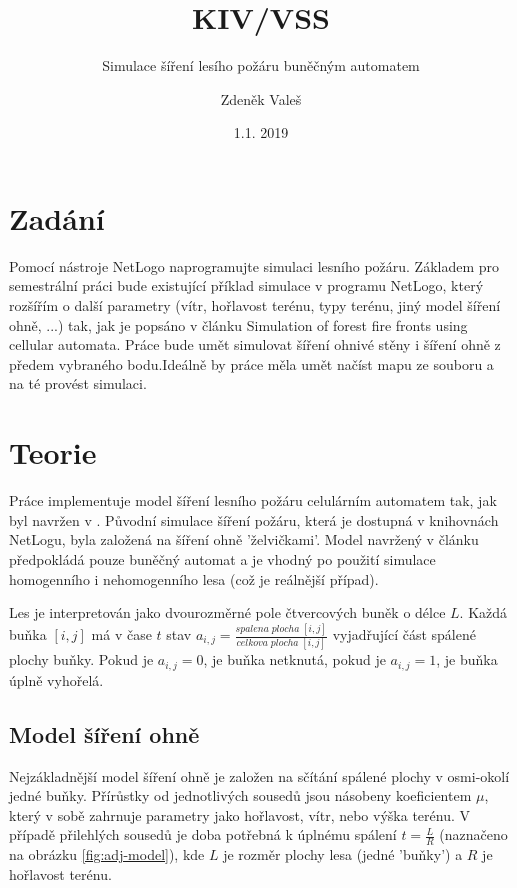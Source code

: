 \documentclass[11pt,a4paper]{scrartcl}
\begin{document}
	\title{KIV/VSS}
	\subtitle{Simulace šíření lesího požáru buněčným automatem}
	\author{Zdeněk Valeš}
	\date{1.1. 2019}
	\maketitle
	\newpage
	
	\section{Zadání}
	Pomocí nástroje NetLogo naprogramujte simulaci lesního požáru. Základem pro semestrální práci bude existující příklad simulace v programu NetLogo, který rozšířím o další parametry (vítr, hořlavost terénu, typy terénu, jiný model šíření ohně, ...) tak, jak je popsáno v článku Simulation of forest fire fronts using cellular automata\cite{source_article}. Práce bude umět simulovat šíření ohnivé stěny i šíření ohně z předem vybraného bodu.Ideálně by práce měla umět načíst mapu ze souboru a na té provést simulaci.
	
	\section{Teorie}
	Práce implementuje model šíření lesního požáru celulárním automatem tak, jak byl navržen v \cite{source_article}. Původní simulace šíření požáru, která je dostupná v knihovnách NetLogu, byla založená na šíření ohně 'želvičkami'. Model navržený v článku předpokládá pouze buněčný automat a je vhodný po použití simulace homogenního i nehomogenního lesa (což je reálnější případ).
	
	Les je interpretován jako dvourozměrné pole čtvercových buněk o délce $L$. Každá buňka $[i,j]$ má v čase $t$ stav $a_{i,j} = \frac{spalena \; plocha \; [i,j]}{celkova \; plocha \; [i,j]}$ vyjadřující část spálené plochy buňky. Pokud je $a_{i,j} = 0$, je buňka netknutá, pokud je $a_{i,j} = 1$, je buňka úplně vyhořelá.
	
	\subsection{Model šíření ohně}
	Nejzákladnější model šíření ohně je založen na sčítání spálené plochy v osmi-okolí jedné buňky. Přírůstky od jednotlivých sousedů jsou násobeny koeficientem $\mu$, který v sobě zahrnuje parametry jako hořlavost, vítr, nebo výška terénu. V případě přilehlých sousedů je doba potřebná k úplnému spálení $t=\frac{L}{R}$ (naznačeno na obrázku \ref{fig:adj-model}), kde $L$ je rozměr plochy lesa (jedné 'buňky') a $R$ je hořlavost terénu.
	
\end{document}
